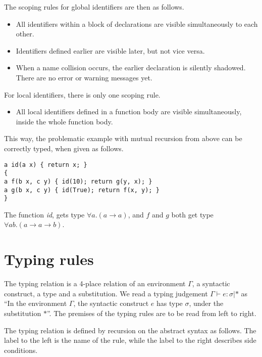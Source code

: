 \documentclass[a4paper]{article}
\newcommand{\arr}{\rightarrow}
\newcommand{\oftype}[2]{#1\!:\!#2}
\begin{document}
The scoping rules for global identifiers are then as follows.

\begin{itemize}

  \item All identifiers within a block of declarations are visible
  simultaneously to each other.

  \item Identifiers defined earlier are visible later, but not vice versa.

  \item When a name collision occurs, the earlier declaration is silently
  shadowed.  There are no error or warning messages yet.

\end{itemize}

For local identifiers, there is only one scoping rule.

\begin{itemize}

  \item All local identifiers defined in a function body are visible
  simultaneously, inside the whole function body.

\end{itemize}

This way, the problematic example with mutual recursion from above can be
correctly typed, when given as follows.

\begin{verbatim}
a id(a x) { return x; }
{
a f(b x, c y) { id(10); return g(y, x); }
a g(b x, c y) { id(True); return f(x, y); }
}
\end{verbatim}

The function \emph{id}, gets type $\forall a .  (a \arr a)$, and $f$ and $g$
both get type $\forall a b . (a \arr a \arr b)$.


\section{Typing rules}

The typing relation is a 4-place relation of an environment $\Gamma$, a
syntactic construct, a type and a substitution.  We read a typing judgement
$\Gamma \vdash \oftype{e}{\sigma} | *$ as ``In the environment $\Gamma$, the
syntactic construct $e$ has type $\sigma$, under the substitution $*$''.  The
premises of the typing rules are to be read from left to right.

The typing relation is defined by recursion on the abstract syntax as follows.
The label to the left is the name of the rule, while the label to the right
describes side conditions.
\end{document}
